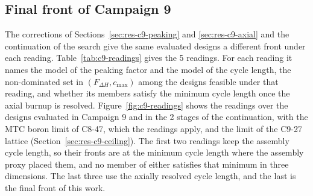 \subsection{Final front of Campaign 9}
\label{sec:res-c9-readings}\label{sec:res-c9-cont-front}

The corrections of Sections~\ref{sec:res-c9-peaking} and
\ref{sec:res-c9-axial} and the continuation of the search give the same
evaluated designs a different front under each reading.
Table~\ref{tab:c9-readings} gives the 5 readings. For each reading it
names the model of the peaking factor and the model of the cycle length,
the non-dominated set in $(F_{\Delta H}, c_\mathrm{max})$ among the
designs feasible under that reading, and whether its members satisfy the
minimum cycle length once the axial burnup is resolved.
Figure~\ref{fig:c9-readings} shows the readings over the designs
evaluated in Campaign 9 and in the 2 stages of the continuation, with
the MTC boron limit of C8-47, which the readings apply, and the limit of
the C9-27 lattice (Section~\ref{sec:res-c9-ceiling}). The first two
readings keep the assembly cycle length, so their fronts are at the
minimum cycle length where the assembly proxy placed them, and no
member of either satisfies that minimum in three dimensions. The last
three use the axially resolved cycle length, and the last is the final
front of this work.

